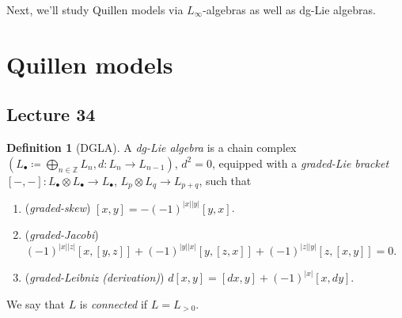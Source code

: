 \documentclass[10pt,letterpaper,cm]{nupset}
\theoremstyle{definition}
\newtheorem{defn}{Definition}[subsection]
\theoremstyle{theorem}
\theoremstyle{remark}
\newcommand{\Z}{\mathbb Z}
\newcommand{\1}{\mathbb{1}}
\newcommand{\0}{\vec 0}
\newcommand{\be}{\begin{enumerate}}
\newcommand{\ee}{\end{enumerate}}
\begin{document}
\medskip

Next, we'll study Quillen models via $L_{\infty}$-algebras as well as dg-Lie algebras.

\section{Quillen models}

\subsection{Lecture 34}

\begin{defn}[DGLA]
A \textit{dg-Lie algebra} is a chain complex $\left(L_{\bullet} \coloneqq \bigoplus_{n \in \Z} L_n, d : L_n \to L_{n-1}\right)$, $d^2 =0$, equipped with a \textit{graded-Lie bracket} $\left[{-}, {-}\right] : L_{\bullet} \otimes L_{\bullet} \to L_{\bullet}$, $L_p \otimes L_q \to L_{p+q}$, such that
\be[label=(\arabic*)]
\item (\textit{graded-skew}) $\left[x,y\right] = {-\left({-1}\right)^{\left\lvert{x}\right\rvert \left\lvert{y}\right\rvert}\left[y,x\right]}$.
\item (\textit{graded-Jacobi}) $\left({-1}\right)^{\left\lvert{x}\right\rvert \left\lvert{z}\right\rvert}\left[x, \left[y, z\right]\right] +
\left({-1}\right)^{\left\lvert{y}\right\rvert \left\lvert{x}\right\rvert}\left[y, \left[z, x\right]\right] + 
\left({-1}\right)^{\left\lvert{z}\right\rvert \left\lvert{y}\right\rvert}\left[z, \left[x, y\right]\right]
= 0$.
\item (\textit{graded-Leibniz (derivation)}) $d{\left[x,y\right]} = \left[d{x},y\right] + \left({-1}\right)^{\left\lvert{x}\right\rvert}\left[x,d{y}\right]$.
\ee
\end{defn}

We say that $L$ is \textit{connected} if $L = L_{>0}$. 
\end{document}
